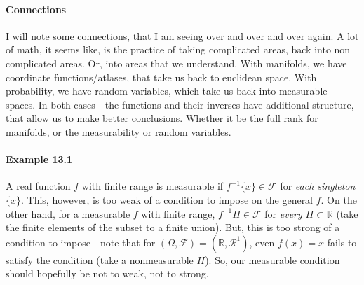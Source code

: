 \documentclass[12pt,a4paper]{article}
\newcommand{\1}[1]{\mathbbm{1}\left\{ #1 \right\}}
\newcommand{\R}{\mathbb{R}}
\newcommand{\fcal}{\mathcal{F}}
\newcommand{\rcal}{\mathcal{R}}
\begin{document}
\paragraph{Connections} I will note some connections, that I am seeing over and over and over again. A lot of math, it seems like, is the practice of taking complicated areas, back into non complicated areas. Or, into areas that we understand. With manifolds, we have coordinate functions/atlases, that take us back to euclidean space. With probability, we have random variables, which take us back into measurable spaces. In both cases - the functions and their inverses have additional structure, that allow us to make better conclusions. Whether it be the full rank for manifolds, or the measurability or random variables.

\paragraph{Example 13.1} A real function $f$ with finite range is measurable if $f^{-1}\{x\} \in \fcal$ for \textit{each singleton $\{x\}$}. This, however, is too weak of a condition to impose on the general $f$. On the other hand, for a measurable $f$ with finite range, $f^{-1}H \in \fcal$ for \textit{every} $H \subset \R$ (take the finite elements of the subset to a finite union). But, this is too strong of a condition to impose - note that for $(\Omega,\fcal) = (\R, \rcal^1)$, even $f(x) = x$ fails to satisfy the condition (take a nonmeasurable $H$). So, our measurable condition should hopefully be not to weak, not to strong. 
\end{document}

